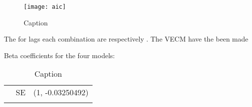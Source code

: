 \begin{figure}
    \centering
    \texttt{[image: aic]}
    \caption{Caption}
    \label{fig:enter-label}
\end{figure}


The for lags each combination are respectively . The VECM have the been made



Beta coefficients for the four models:
\begin{table}[]
    \centering
    \begin{tabular}{c|c|c}
       & SE & (1, -0.03250492) \\
       &  & 
    \end{tabular}
    \caption{Caption}
    \label{tab:my_label}
\end{table}









